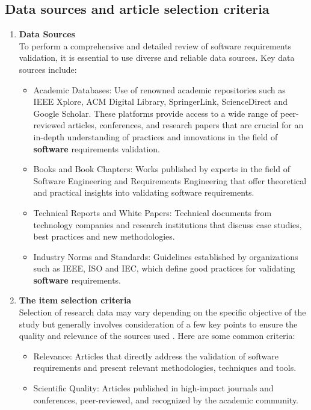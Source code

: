 \subsection{Data sources and article selection criteria}
\begin{enumerate}
 \item \textbf{Data Sources} \\
 To perform a comprehensive and detailed review of software requirements validation, it is essential to use diverse and reliable \cite{webster2002analyzing} data sources. Key data sources include:
 \begin{itemize}
 \item {Academic Databases}: Use of renowned academic repositories such as IEEE Xplore, ACM Digital Library, SpringerLink, ScienceDirect and Google Scholar. These platforms provide access to a wide range of peer-reviewed articles, conferences, and research papers that are crucial for an in-depth understanding of practices and innovations in the field of \textbf{software} requirements validation.
 \item Books and Book Chapters: Works published by experts in the field of Software Engineering and Requirements Engineering that offer theoretical and practical insights into validating software requirements.
 \item Technical Reports and {White Papers}: Technical documents from technology companies and research institutions that discuss case studies, best practices and new methodologies.
 \item Industry Norms and Standards: Guidelines established by organizations such as IEEE, ISO and IEC, which define good practices for validating \textbf{software} requirements.\
 \end{itemize}
\item \textbf{The item selection criteria} \\
Selection of research data may vary depending on the specific objective of the study but generally involves consideration of a few key points to ensure the quality and relevance of the sources used \cite{ridley2012literature}. Here are some common criteria:
\begin{itemize}
 \item Relevance: Articles that directly address the validation of software requirements and present relevant methodologies, techniques and tools.
 \item Scientific Quality: Articles published in high-impact journals and conferences, peer-reviewed, and recognized by the academic community.

\end{itemize}
\end{enumerate}
